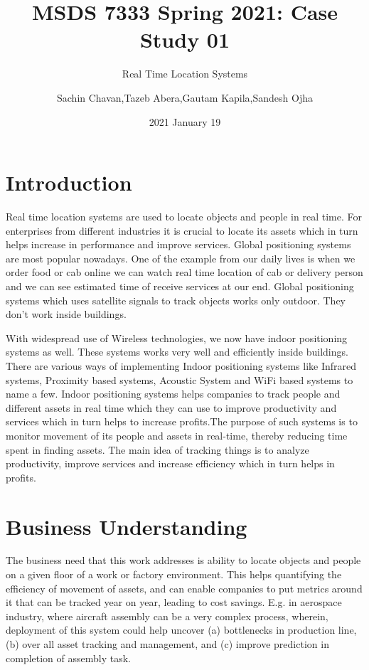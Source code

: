 \documentclass[
]{article}
\title{MSDS 7333 Spring 2021: Case Study 01}
\subtitle{Real Time Location Systems}
\author{Sachin Chavan,Tazeb Abera,Gautam Kapila,Sandesh Ojha}
\date{2021 January 19}
\begin{document}
\maketitle

\hypertarget{introduction}{%
\section{Introduction}\label{introduction}}

Real time location systems are used to locate objects and people in real
time. For enterprises from different industries it is crucial to locate
its assets which in turn helps increase in performance and improve
services. Global positioning systems are most popular nowadays. One of
the example from our daily lives is when we order food or cab online we
can watch real time location of cab or delivery person and we can see
estimated time of receive services at our end. Global positioning
systems which uses satellite signals to track objects works only
outdoor. They don't work inside buildings.

With widespread use of Wireless technologies, we now have indoor
positioning systems as well. These systems works very well and
efficiently inside buildings. There are various ways of implementing
Indoor positioning systems like Infrared systems, Proximity based
systems, Acoustic System and WiFi based systems to name a few. Indoor
positioning systems helps companies to track people and different assets
in real time which they can use to improve productivity and services
which in turn helps to increase profits.The purpose of such systems is
to monitor movement of its people and assets in real-time, thereby
reducing time spent in finding assets. The main idea of tracking things
is to analyze productivity, improve services and increase efficiency
which in turn helps in profits.

\hypertarget{business-understanding}{%
\section{Business Understanding}\label{business-understanding}}

The business need that this work addresses is ability to locate objects
and people on a given floor of a work or factory environment. This helps
quantifying the efficiency of movement of assets, and can enable
companies to put metrics around it that can be tracked year on year,
leading to cost savings. E.g. in aerospace industry, where aircraft
assembly can be a very complex process, wherein, deployment of this
system could help uncover (a) bottlenecks in production line, (b) over
all asset tracking and management, and (c) improve prediction in
completion of assembly task.
\end{document}
